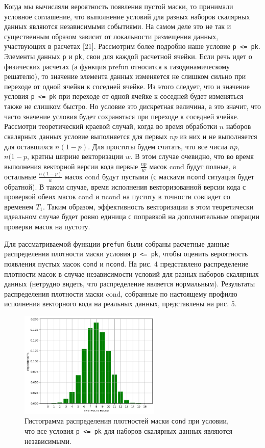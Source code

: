 Когда мы вычисляли вероятность появления пустой маски, то принимали условное соглашение, что выполнение условий для разных наборов скалярных данных являются независимыми событиями.
На самом деле это не так и существенным образом зависит от локальности размещения данных, участвующих в расчетах [21].
Рассмотрим более подробно наше условие \texttt{p <= pk}.
Элементы данных \texttt{p} и \texttt{pk}, свои для каждой расчетной ячейки.
Если речь идет о физических расчетах (а функция prefun относится к газодинамическому решателю), то значение элемента данных изменяется не слишком сильно при переходе от одной ячейки к соседней ячейке.
Из этого следует, что и значение условия \texttt{p <= pk} при переходе от одной ячейке к соседней будет изменяться также не слишком быстро.
Но условие это дискретная величина, а это значит, что часто значение условия будет сохраняться при переходе к соседней ячейке.
Рассмотри теоретический краевой случай, когда во время обработки $n$ наборов скалярных данных условие выполняется для первых $np$ из них и не выполняется для оставшихся $n(1 - p)$.
Для простоты будем считать, что все числа $np$, $n(1 - p$, кратны ширине векторизации $w$.
В этом случае очевидно, что во время выполнения векторной версии кода первые $\frac{np}{w}$ масок cond будут полные, а остальные $\frac{n(1 - p)}{w}$ масок cond будут пустыми (с масками \texttt{ncond} ситуация будет обратной).
В таком случае, время исполнения векторизованной версии кода с проверкой обеих масок cond и ncond на пустоту в точности совпадет со временем $T_1$.
Таким образом, эффективность векторизации в этом теоретически идеальном случае будет ровно единица с поправкой на дополнительные операции проверки масок на пустоту.

Для рассматриваемой функции \texttt{prefun} были собраны расчетные данные распределения плотности маски условия \texttt{p <= pk}, чтобы оценить вероятность появления пустых масок \texttt{cond} и \texttt{ncond}.
На рис. 4 представлено распределение плотности масок в случае независимости условий для разных наборов скалярных данных (нетрудно видеть, что распределение является нормальным).
Результаты распределения плотности маски cond, собранные по настоящему профилю исполнения векторного кода на реальных данных, представлены на рис. 5.

\begin{figure}[ht]
	\centering
		\includegraphics[width=0.6\textwidth]{./pics/text_4_vec_comb_mask/independent_p.png}
	\caption{Гистограмма распределения плотностей маски \texttt{cond} при условии, что все условия \texttt{p <= pk} для наборов скалярных данных являются независимыми.}
	\label{fig:text_4_vec_comb_mask_independent_p}
\end{figure}

